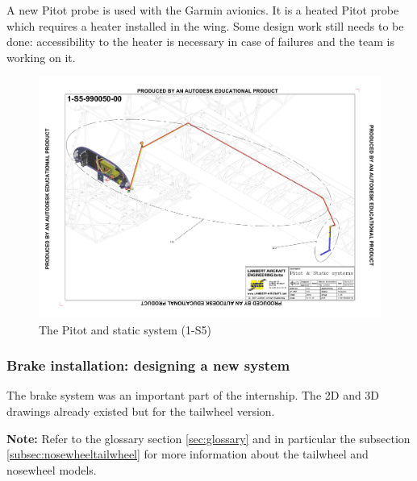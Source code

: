 \documentclass[11pt,a4paper]{article}
\begin{document}
\bigskip

A new Pitot probe is used with the Garmin avionics. It is a heated Pitot probe which requires a heater installed in the wing. Some design work still needs to be done: accessibility to the heater is necessary in case of failures and the team is working on it.

\bigskip

\begin{figure}[ht!]
	\begin{center}
		\includegraphics[width=15cm,trim = 1.5cm 1.5cm 1.5cm 1.5cm, clip]{pics/PIC017.pdf}
		\caption{The Pitot and static system (1-S5)}
		\label{fig:PIC017}
	\end{center}
\end{figure}

\newpage

\subsubsection{Brake installation: designing a new system}
\label{subsubsec:brakes}

The brake system was an important part of the internship. The 2D and 3D drawings already existed but for the tailwheel version.

\bigskip

\textbf{Note:} Refer to the glossary section \ref{sec:glossary} and in particular the subsection \ref{subsec:nosewheeltailwheel} for more information about the tailwheel and nosewheel models.
\end{document}
